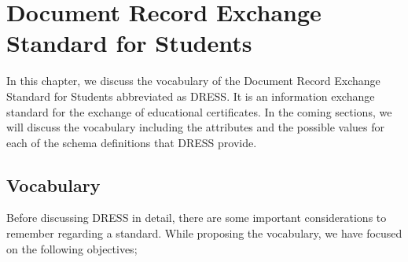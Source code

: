 \documentclass[12pt,a4paper,oneside]{book}
\begin{document}





\chapter{Document Record Exchange Standard for Students}\label{ch-DRESS}

In this chapter, we discuss the vocabulary of the Document Record Exchange Standard for Students abbreviated as DRESS. It is an information exchange standard for the exchange of educational certificates.  
In the coming sections, we will discuss the vocabulary including the attributes and the possible values for each of the schema definitions that DRESS provide.
  




\section{Vocabulary}

Before discussing DRESS in detail, there are some important considerations to remember regarding a standard. While proposing the vocabulary, we have focused on the following objectives;
\end{document}
